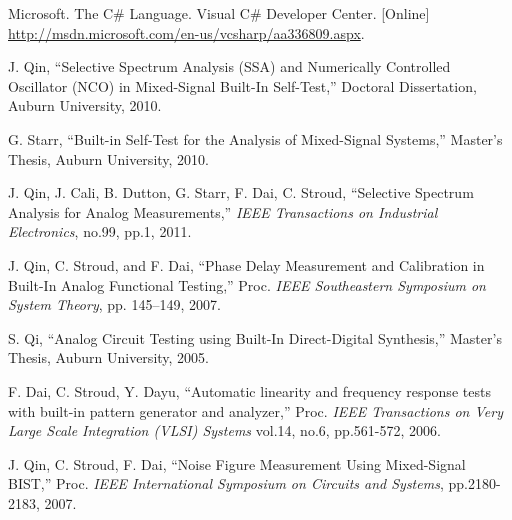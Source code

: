 \documentclass[12pt]{report}
\begin{document}
\begin{thebibliography}{99}
 Microsoft. The C\# Language. Visual C\# Developer Center. [Online] \url{http://msdn.microsoft.com/en-us/vcsharp/aa336809.aspx}.

 J. Qin, ``Selective Spectrum Analysis (SSA) and Numerically Controlled Oscillator (NCO) in Mixed-Signal Built-In Self-Test,'' Doctoral Dissertation, Auburn University, 2010.

 G. Starr, ``Built-in Self-Test for the Analysis of Mixed-Signal Systems,'' Master's Thesis, Auburn University, 2010.

 J. Qin, J. Cali, B. Dutton, G. Starr, F. Dai, C. Stroud, ``Selective Spectrum Analysis for Analog Measurements,'' \textit{IEEE Transactions on Industrial Electronics}, no.99, pp.1, 2011.

 J. Qin, C. Stroud, and F. Dai, ``Phase Delay Measurement and Calibration in Built-In Analog Functional Testing,” Proc. \textit{IEEE Southeastern Symposium on System Theory}, pp. 145–149, 2007.

 S. Qi, ``Analog Circuit Testing using Built-In Direct-Digital Synthesis,'' Master's Thesis, Auburn University, 2005.

 F. Dai, C. Stroud, Y. Dayu, ``Automatic linearity and frequency response tests with built-in pattern generator and analyzer,'' Proc. \textit{IEEE Transactions on Very Large Scale Integration (VLSI) Systems} vol.14, no.6, pp.561-572, 2006.

 J. Qin, C. Stroud, F. Dai, ``Noise Figure Measurement Using Mixed-Signal BIST,'' Proc. \textit{IEEE International Symposium on Circuits and Systems}, pp.2180-2183, 2007.

\label{Bibliography}
\end{thebibliography}

\appendix
{}
\end{document}
